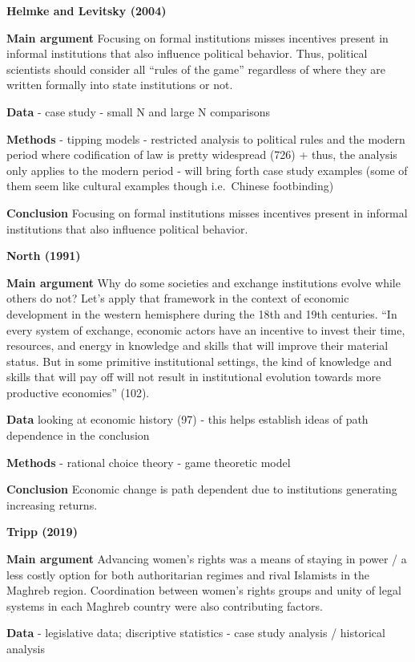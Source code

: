 \documentclass[
  english,
  man]{apa6}
\begin{document}
\textbf{Helmke and Levitsky (2004)}

\textbf{Main argument}
Focusing on formal institutions misses incentives present in informal institutions that also influence political behavior. Thus, political scientists should consider all ``rules of the game'' regardless of where they are written formally into state institutions or not.

\textbf{Data}
- case study
- small N and large N comparisons

\textbf{Methods}
- tipping models
- restricted analysis to political rules and the modern period where codification of law is pretty widespread (726)
+ thus, the analysis only applies to the modern period
- will bring forth case study examples (some of them seem like cultural examples though i.e.~Chinese footbinding)

\textbf{Conclusion}
Focusing on formal institutions misses incentives present in informal institutions that also influence political behavior.

\textbf{North (1991)}

\textbf{Main argument}
Why do some societies and exchange institutions evolve while others do not? Let's apply that framework in the context of economic development in the western hemisphere during the 18th and 19th centuries. ``In every system of exchange, economic actors have an incentive to invest their time, resources, and energy in knowledge and skills that will improve their material status. But in some primitive institutional settings, the kind of knowledge and skills that will pay off will not result in institutional evolution towards more productive economies'' (102).

\textbf{Data}
looking at economic history (97)
- this helps establish ideas of path dependence in the conclusion

\textbf{Methods}
- rational choice theory
- game theoretic model

\textbf{Conclusion}
Economic change is path dependent due to institutions generating increasing returns.

\textbf{Tripp (2019)}

\textbf{Main argument}
Advancing women's rights was a means of staying in power / a less costly option for both authoritarian regimes and rival Islamists in the Maghreb region. Coordination between women's rights groups and unity of legal systems in each Maghreb country were also contributing factors.

\textbf{Data}
- legislative data; discriptive statistics
- case study analysis / historical analysis
\end{document}
